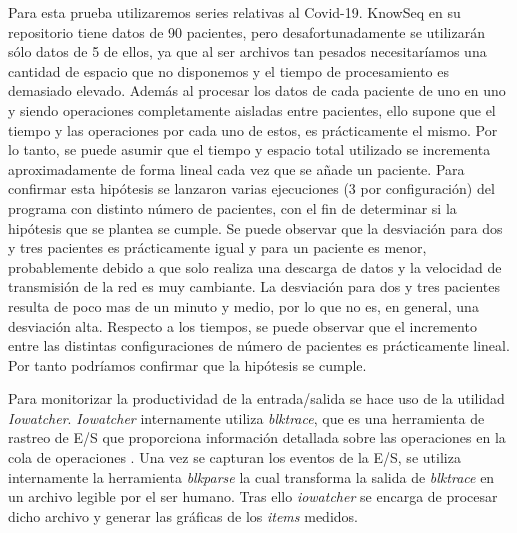Para esta prueba utilizaremos series relativas al Covid-19. KnowSeq en su repositorio tiene datos de 90 pacientes, pero desafortunadamente se utilizarán sólo datos de 5 de ellos, ya que al ser archivos tan pesados necesitaríamos una cantidad de espacio que no disponemos y el tiempo de procesamiento es demasiado elevado. Además al procesar los datos de cada paciente de uno en uno y siendo operaciones completamente aisladas entre pacientes, ello supone que el tiempo y las operaciones por cada uno de estos, es prácticamente el mismo. Por lo tanto, se puede asumir que el tiempo y espacio total utilizado se incrementa aproximadamente de forma lineal cada vez que se añade un paciente. Para confirmar esta hipótesis se lanzaron varias ejecuciones (3 por configuración) del programa con distinto número de pacientes, con el fin de determinar si la hipótesis que se plantea se cumple. Se puede observar que la desviación para dos y tres pacientes es prácticamente igual y para un paciente es menor, probablemente debido a que solo realiza una descarga de datos y la velocidad de transmisión de la red es muy cambiante. La desviación para dos y tres pacientes resulta de poco mas de un minuto y medio, por lo que no es, en general, una desviación alta. Respecto a los tiempos, se puede observar que el incremento entre las distintas configuraciones de número de pacientes es prácticamente lineal. Por tanto podríamos confirmar que la hipótesis se cumple. \\
\begin{table}[h]
    \centering
    \caption{Tiempos de ejecución para KnowSeq con distinto número de pacientes}
    \label{tab:my_label}
\end{table}
\begin{table}[h]
    \centering
\end{table}

Para monitorizar la productividad de la entrada/salida se hace uso de la utilidad \textit{Iowatcher}. \textit{Iowatcher} internamente utiliza \textit{blktrace}, que es una herramienta de rastreo de E/S que proporciona información detallada sobre las operaciones en la cola de operaciones \cite{blktrace}. Una vez se capturan los eventos de la E/S, se utiliza internamente la herramienta \textit{blkparse} la cual transforma la salida de \textit{blktrace} en un archivo legible por el ser humano. Tras ello \textit{iowatcher} se encarga de procesar dicho archivo y generar las gráficas de los \textit{items} medidos.\\


